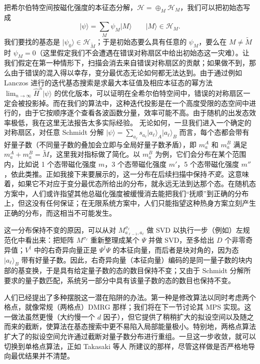 \documentclass[a4paper,10pt,oneside,onecolumn,1p,times]{elsarticle}
\newcommand{\ket}[1]{\mbox{$| #1  \rangle$}}
\begin{document}
把希尔伯特空间按磁化强度的本征态分解，${\mathcal H} = \oplus_M {\mathcal H}_M$，我们可以把初始态写成
\begin{equation}
\ket{\psi} = \sum_M \psi_M \ket{M} \quad\quad \ket{M} \in {\mathcal H}_M .
\end{equation}
我们要找的基态是 $\ket{\psi_0} \in {\mathcal H}_{\tilde{M}}$；于是初始态要么具有任意的 $\psi_M$，要么在 $M \neq \tilde{M}$ 时 $\psi_M = 0$（这里假定我们不会遭遇在错误对称扇区中给出初始态这一灾难）。让我们假定在第一种情形下，扫描会消去来自错误对称扇区的贡献；如果做不到，那么由于错误的混入得以幸存，变分最优态无论如何都无法达到。由于通过例如 Lanczos 进行的迭代基态搜索是求最大本征值及相应本征态的幂方法 $\lim_{n\rightarrow\infty} \hat{H}^n \ket{\psi}$ 的优化版本，可以证明在全希尔伯特空间中，错误的对称扇区一定会被投影掉。而在我们的算法中，这种迭代投影是在一个高度受限的态空间中进行的，由于它按顺序逐个查看各波函数分量，效率可能不高。由于随机的出发态效率极低，我在这里无法报告太多实际经验。
无论如何，一旦我们进入一个确定的对称扇区，对任意 Schmidt 分解 $\ket{\psi} = \sum_{a_\ell} s_{a_\ell} \ket{a_\ell}_A \ket{a_\ell}_B$ 而言，每个态都会带有好量子数（不同量子数的叠加会立即与全局好量子数矛盾），即 $m_a^A$ 和 $m_a^B$ 满足 $m_a^A + m_a^B = \tilde{M}$，这里我对指标做了简化。以 $m_a^B$ 为例，它们会分布在某个范围内，比如说 1 个态带磁化强度 $m$，3 个态带磁化强度 $m'$，5 个态带磁化强度 $m''$，依此类推。正如我接下来要展示的，这一分布在后续扫描中保持{\em 不变}。这意味着，如果它不对应于变分最优态所给出的分布，就永远无法到达那个态。在随机态方案中，人们或许指望其他总磁化强度被缓慢消去能把我们``抚顺''到正确的分布上，但这没有任何保证；在无限系统方案中，人们只能指望这种热身方案立刻产生正确的分布，而这相当不可能发生。

这一分布保持不变的原因，可以从对 $M^{\sigma_{\ell}}_{a_{\ell-1},a_{\ell}}$ 做 SVD 以执行一步（例如）左规范化中看出来：把矩阵 $M^{\sigma_{\ell}}$ 重新整理成某个 $\Psi$ 并做 SVD，至多给出 $D$ 个非零奇异值；$V^\dagger$ 中的右奇异向量正是 $\Psi^\dagger \Psi$ 的本征向量，而后者是块对角的，因为态 $\ket{a_{\ell}}_B$ 带有好量子数。因此，右奇异向量（本征向量）编码的是同一量子数的块内部的基变换，于是具有给定量子数的态的数目保持不变；又由于 Schmidt 分解所要求的量子数匹配，系统另一部分中具有该量子数的态的数目也保持不变。

人们已经提出了多种摆脱这一潜在陷阱的办法。第一种是修改算法以同时考虑两个格点，就像常规（两格点）DMRG 那样；我们将在下一节讨论其 MPS 实现。这一做法虽然更慢（大约慢一个 $d$ 因子），但它提供了稍稍扩大的拟设空间以及随之而来的截断，使算法在基态搜索中更不易陷入局部能量极小。特别地，两格点算法扩大了的拟设空间允许通过截断对量子数分布进行重组。一旦这一步收敛，就可以切换到单格点算法，正如 Takasaki 等人 \cite{Takasaki99} 所建议的那样，尽管这样做是否严格地导向最优结果并不清楚\cite{McCulloch08}。
\end{document}
